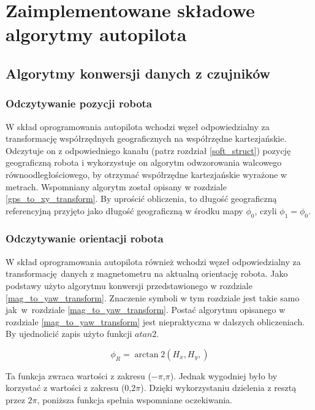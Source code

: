 \newpage
\section{Zaimplementowane składowe algorytmy autopilota}
\label{algorithms}
{
    \subsection{Algorytmy konwersji danych z czujników}
    {
        \subsubsection{Odczytywanie pozycji robota}
        {
            W skład oprogramowania autopilota wchodzi węzeł odpowiedzialny za transformację współrzędnych geograficznych na współrzędne kartezjańskie. Odczytuje on z odpowiedniego kanału (patrz rozdział \ref{soft_struct}) pozycję geograficzną robota i wykorzystuje on algorytm odwzorowania walcowego równoodległościowego, by otrzymać współrzędne kartezjańskie wyrażone w metrach. Wspomniany algorytm został opisany w rozdziale \ref{gps_to_xy_transform}. By uprościć obliczenia, to długość geograficzną referencyjną przyjęto jako długość geograficzną w środku mapy \textbf{$\phi_0$}, czyli \textbf{$\phi_1 = \phi_0$}. 
        }
        \subsubsection{Odczytywanie orientacji robota}
        {
            W skład oprogramowania autopilota również wchodzi węzeł odpowiedzialny za transformację danych z magnetometru na aktualną orientację robota. Jako podstawy użyto algorytmu konwersji przedstawionego w rozdziale \ref{mag_to_yaw_transform}. Znaczenie symboli w tym rozdziale jest takie samo jak~w~rozdziale \ref{mag_to_yaw_transform}. Postać algorytmu opisanego w rozdziale \ref{mag_to_yaw_transform} jest niepraktyczna w dalszych obliczeniach. By ujednolicić zapis użyto funkcji $atan2$. 
            
            \begin{equation}
                    \phi_R= \arctan2(H_x,H_y,) \label{eq:1}
            \end{equation}
            
            Ta funkcja zwraca wartości z zakresu ($-\pi$,$\pi$). Jednak wygodniej było by korzystać z wartości z zakresu ($0$,$2\pi$). Dzięki wykorzystaniu dzielenia z resztą przez $2\pi$, poniższa funkcja spełnia wspomniane oczekiwania. 
            
}}}
